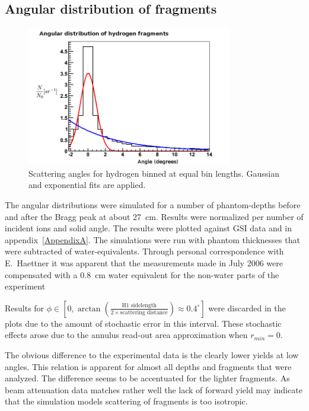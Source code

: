 \subsection{Angular distribution of fragments}
\begin{figure}[!h] 
\begin{center}
\includegraphics[width=0.8\textwidth]{images/plots/angularDistributions/equlBinnedHydrogen279.png}  
\caption{\label{fig:binnedHydrogen} Scattering angles for hydrogen binned at equal bin lengths. Gaussian and exponential fits are applied.}
 \end{center}
 \end{figure}
The angular distributions were simulated for a number of phantom-depths before and after the Bragg peak at about 27~cm. Results were normalized per number of incident ions and solid angle. The results were plotted against GSI data and in appendix~\ref{AppendixA}. The simulations were run with phantom thicknesses that were subtracted of water-equivalents. Through personal correspondence with E.~Haettner it was apparent that the measurements made in July 2006 were compensated with a $0.8$~cm water equivalent for the non-water parts of the experiment

Results for $\phi \in [0,\arctan\left(\frac{\text{H1 sidelength}}{2 \times \text{scattering distance}}\right) \approx 0.4^{\circ}]$ were discarded in the plots due to the amount of stochastic error in this interval. These stochastic effects arose due to the annulus read-out area approximation when $r_{min} = 0$.

The obvious difference to the experimental data is the clearly lower yields at low angles. This relation is apparent for almost all depths and fragments that were analyzed. The difference seems to be accentuated for the lighter fragments. As beam attenuation data matches rather well the lack of forward yield may indicate that the simulation models scattering of fragments is too isotropic.

